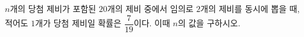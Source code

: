 $n$개의 당첨 제비가 포함된 $20$개의 제비 중에서 임의로 $2$개의 제비를 동시에 뽑을 때, 적어도 $1$개가 당첨 제비일 확률은 $\dfrac{7}{19}$이다. 이때 $n$의 값을 구하시오.
